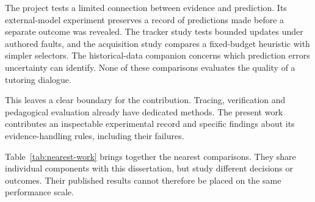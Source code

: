 The project tests a limited connection between evidence and prediction. Its external-model experiment preserves a record of
predictions made before a separate outcome was revealed. The tracker study tests bounded updates under authored faults, and
the acquisition study compares a fixed-budget heuristic with simpler selectors. The historical-data companion concerns
which prediction errors uncertainty can identify. None of these comparisons evaluates the quality of a tutoring dialogue.

This leaves a clear boundary for the contribution. Tracing, verification and pedagogical evaluation already have dedicated
methods. The present work contributes an inspectable experimental record and specific findings about its evidence-handling
rules, including their failures.

Table~\ref{tab:nearest-work} brings together the nearest comparisons. They share individual components with this dissertation,
but study different decisions or outcomes. Their published results cannot therefore be placed on the same performance scale.


